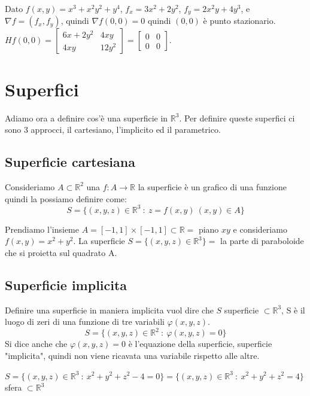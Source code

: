 \begin{example}
Dato $f(x,y) = x^3 + x^2y^2 + y^4$, $f_x = 3x^2 + 2y^2$, $f_y = 2x^2y + 4y^3$, e $\nabla f = (f_x, f_y)$, quindi $\nabla f(0,0) = 0$ quindi $(0,0)$ è punto stazionario.\\
$Hf(0,0) = \begin{bmatrix}6x + 2y^2 & 4xy \\4xy & 12y^2\end{bmatrix} = \begin{bmatrix}0 & 0 \\ 0 & 0\end{bmatrix}$.
\end{example}

\newpage
\section{Superfici}
Adiamo ora a definire cos'è una superficie in $\mathbb{R}^3$. Per definire queste superfici ci sono 3 approcci, il cartesiano, l'implicito ed il parametrico.

\subsection{Superficie cartesiana}
Consideriamo $A \subset \mathbb{R}^2$ una $f: A \to \mathbb{R}$ la superficie è un grafico di una funzione quindi la possiamo definire come:
\[S = \{(x,y,z) \in \mathbb{R}^3 \::\: z = f(x,y) \: (x,y) \in A\}\]
\begin{example}
Prendiamo l'insieme $A = [-1,1] \times [-1,1] \subset \mathbb{R} =$ piano $xy$ e consideriamo $f(x,y) = x^2 + y^2$. La superficie $S = \{(x,y,z) \in \mathbb{R}^3\} = $ la parte di paraboloide che si proietta sul quadrato A.
\end{example}

\subsection{Superficie implicita}
Definire una superficie in maniera implicita vuol dire che $S$ superficie $\subset \mathbb{R}^3$, S è il luogo di zeri di una funzione di tre variabili $\varphi(x,y,z)$.
\[S = \{(x,y,z) \in \mathbb{R}^2 \::\: \varphi(x,y,z) = 0\}\]
Si dice anche che $\varphi(x,y,z) = 0$ è l'equazione della superficie, superficie "implicita", quindi non viene ricavata una variabile rispetto alle altre.

\begin{example}
$S = \{(x,y,z) \in \mathbb{R}^3 \::\: x^2 + y^2 + z^2 - 4 = 0\} = \{(x,y,z) \in \mathbb{R}^3 \::\: x^2 + y^2 + z^2 = 4\}$ sfera $\subset \mathbb{R}^3$
\end{example}

